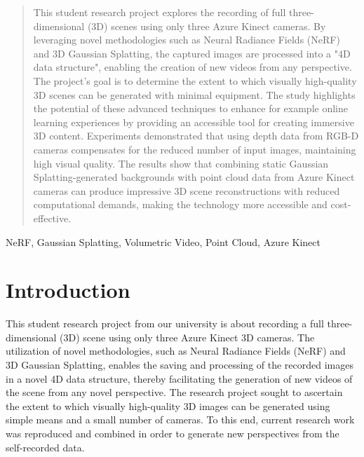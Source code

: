 \documentclass[conference]{IEEEtran}
\begin{document}
\begin{abstract}
This student research project explores the recording of full three-dimensional (3D) scenes using only three Azure Kinect cameras. By leveraging novel methodologies such as Neural Radiance Fields (NeRF) and 3D Gaussian Splatting, the captured images are processed into a "4D data structure", enabling the creation of new videos from any perspective. The project's goal is to determine the extent to which visually high-quality 3D scenes can be generated with minimal equipment. The study highlights the potential of these advanced techniques to enhance for example online learning experiences by providing an accessible tool for creating immersive 3D content. Experiments demonstrated that using depth data from RGB-D cameras compensates for the reduced number of input images, maintaining high visual quality. The results show that combining static Gaussian Splatting-generated backgrounds with point cloud data from Azure Kinect cameras can produce impressive 3D scene reconstructions with reduced computational demands, making the technology more accessible and cost-effective.
\end{abstract}

\begin{IEEEkeywords}
NeRF, Gaussian Splatting, Volumetric Video, Point Cloud, Azure Kinect
\end{IEEEkeywords}

\section{Introduction}
This student research project from our university is
about recording a full three-dimensional (3D) scene using only three Azure Kinect 3D cameras. The utilization of novel methodologies, such as Neural Radiance Fields (NeRF) and 3D Gaussian Splatting, enables the saving and processing of the recorded images in a novel 4D data structure, thereby facilitating the generation of new videos of the scene from any novel perspective. The research project sought to ascertain the extent to which visually high-quality 3D images can be generated using simple means and a small number of cameras. To this end, current research work was reproduced and
combined in order to generate new perspectives from the self-recorded data. 
\end{document}
